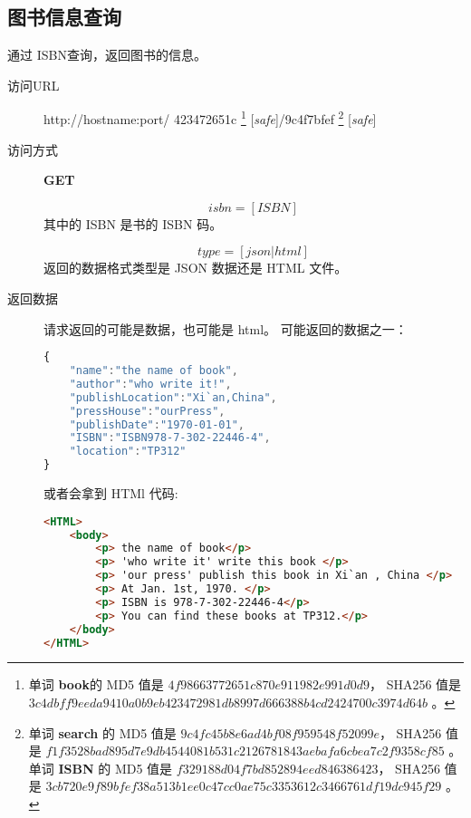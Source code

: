 \documentclass[UTF8]{article}
\def\safe{[\textit{safe}]}
\def\GET{\textbf{GET}}
\def\viaurl#1{\item[访问URL] #1}
\def\viareq#1{\item[访问方式] #1}
\def\rtdata{\item[返回数据]}
\begin{document}
        \subsection{图书信息查询}
                通过 ISBN查询，返回图书的信息。
                \begin{description}
                    
                    \viaurl http://hostname:port/
                    423472651c
                    \footnote{单词 \textbf{book}的
                        MD5 值是 $4f98663772651c870e911982e991d0d9$，
                        SHA256 值是
                        $3c4dbff9eeda9410a0b9eb423472981db8997d666388b4cd2424700c3974d64b$
                        。
                    }
                    \safe/9c4f7bfef
                    \footnote{
                        单词 \textbf{search} 的
                        MD5 值是 $9c4fc45b8e6ad4bf08f959548f52099e$，
                        SHA256 值是
                        $f1f3528bad895d7e9db4544081b531c2126781843aebafa6cbea7c2f9358cf85$
                        。
                        单词 \textbf{ISBN} 的
                        MD5 值是 $f329188d04f7bd852894eed846386423$，
                        SHA256 值是
                        $3cb720e9f89bfef38a513b1ee0c47cc0ae75c3353612c3466761df19dc945f29$
                        。
                    }
                    \safe
                    
                    
                    \viareq \GET
                    
                    
                    $$isbn=[ISBN]$$
                    其中的 ISBN 是书的 ISBN 码。
                    
                    
                    $$type=[json|html]$$
                    返回的数据格式类型是 JSON 数据还是 HTML 文件。
                    
                    \rtdata 请求返回的可能是数据，也可能是 html。
                    可能返回的数据之一：
                    \begin{lstlisting}[language=JavaScript]
{
    "name":"the name of book",
    "author":"who write it!",
    "publishLocation":"Xi`an,China",
    "pressHouse":"ourPress",
    "publishDate":"1970-01-01",
    "ISBN":"ISBN978-7-302-22446-4",
    "location":"TP312"
}
                    \end{lstlisting}
                    或者会拿到 HTMl 代码:
                    \begin{lstlisting}[language=HTML]
<HTML>
    <body>
        <p> the name of book</p>
        <p> 'who write it' write this book </p>
        <p> 'our press' publish this book in Xi`an , China </p>
        <p> At Jan. 1st, 1970. </p>
        <p> ISBN is 978-7-302-22446-4</p>
        <p> You can find these books at TP312.</p>
    </body>
</HTML>
                    \end{lstlisting}
                \end{description}
\end{document}
